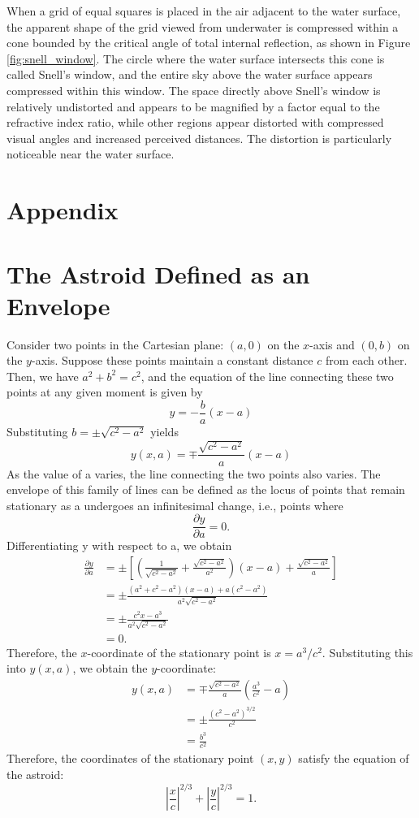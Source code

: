 \documentclass[twocolumn]{article}
\begin{document}
When a grid of equal squares is placed in the air adjacent to the water surface, the apparent shape of the grid viewed from underwater is compressed within a cone bounded by the critical angle of total internal reflection, as shown in Figure \ref{fig:snell_window}. The circle where the water surface intersects this cone is called Snell's window, and the entire sky above the water surface appears compressed within this window. The space directly above Snell's window is relatively undistorted and appears to be magnified by a factor equal to the refractive index ratio, while other regions appear distorted with compressed visual angles and increased perceived distances. The distortion is particularly noticeable near the water surface.



\appendix
\section*{Appendix}
\section{The Astroid Defined as an Envelope} \label{app:astroid}
Consider two points in the Cartesian plane: $(a, 0)$ on the $x$-axis and $(0, b)$ on the $y$-axis. Suppose these points maintain a constant distance $c$ from each other. Then, we have $a^2 + b^2 = c^2$, and the equation of the line connecting these two points at any given moment is given by
$$y = -\frac{b}{a}(x-a)$$
Substituting $b = \pm \sqrt{c^2 - a^2}$ yields
$$y(x, a) = \mp \frac{\sqrt{c^2 - a^2}}{a}(x-a)$$
As the value of a varies, the line connecting the two points also varies. The envelope of this family of lines can be defined as the locus of points that remain stationary as a undergoes an infinitesimal change, i.e., points where
$$\frac{\partial y}{\partial a} = 0.$$
Differentiating y with respect to a, we obtain
$$
\begin{aligned}
	\frac{\partial y}{\partial a} &= \pm\left[\left( \frac{1}{\sqrt{c^2-a^2}}+\frac{\sqrt{c^2-a^2}}{a^2}\right) (x-a) + \frac{\sqrt{c^2-a^2}}{a} \right]\\
	&= \pm \frac{(a^2+c^2-a^2)(x-a)+a(c^2-a^2)}{a^2\sqrt{c^2-a^2}}\\
	&= \pm \frac{c^2 x - a^3}{a^2 \sqrt{c^2 - a^2}}\\
	&= 0.
\end{aligned}
$$
Therefore, the $x$-coordinate of the stationary point is $x = a^3/c^2$. Substituting this into $y(x, a)$, we obtain the $y$-coordinate:
$$
\begin{aligned}
	y(x, a) &= \mp \frac{\sqrt{c^2-a^2}}{a}\left(\frac{a^3}{c^2}-a\right)\\
	& = \pm \frac{\left( c^2- a^2 \right)^{3/2}}{c^2}\\
	& = \frac{b^3}{c^2}
\end{aligned}
$$
Therefore, the coordinates of the stationary point $(x, y)$ satisfy the equation of the astroid:
$$ \left|\dfrac{x}{c}\right|^{2/3} + \left|\dfrac{y}{c}\right|^{2/3} = 1. $$
\end{document}
